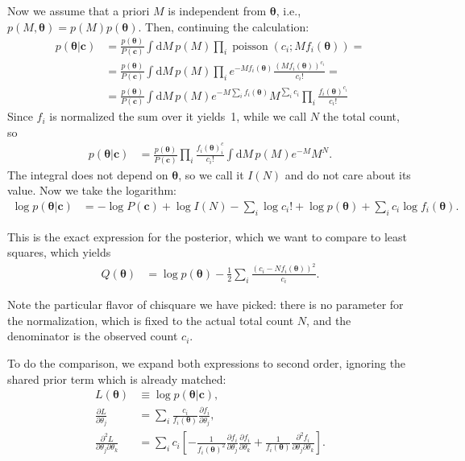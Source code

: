 Now we assume that a priori $M$ is independent from $\boldsymbol\theta$, i.e., 
$p(M,\boldsymbol\theta) = p(M)p(\boldsymbol\theta)$. Then, continuing the
calculation:
%
\begin{align}
    p(\boldsymbol\theta|\mathbf c)
    &= \frac {p(\boldsymbol\theta)} {P(\mathbf c)}
    \int \mathrm dM\, p(M)
    \prod_i \operatorname{poisson}(c_i;Mf_i(\boldsymbol\theta)) = \\
    &= \frac {p(\boldsymbol\theta)} {P(\mathbf c)}
    \int \mathrm dM\, p(M)
    \prod_i
    e^{-Mf_i(\boldsymbol\theta)}
    \frac {(Mf_i(\boldsymbol\theta))^{c_i}} {c_i!} = \\
    &= \frac {p(\boldsymbol\theta)} {P(\mathbf c)}
    \int \mathrm dM\, p(M)
    e^{-M \sum_i f_i(\boldsymbol\theta)}
    M^{\sum_i c_i}
    \prod_i
    \frac {f_i(\boldsymbol\theta)^{c_i}} {c_i!}
\end{align}
%
Since $f_i$ is normalized the sum over it yields~1, while we call $N$ the total
count, so
%
\begin{align}
    p(\boldsymbol\theta|\mathbf c)
    &= \frac {p(\boldsymbol\theta)} {P(\mathbf c)}
    \prod_i
    \frac {f_i(\boldsymbol\theta)^c_i} {c_i!}
    \int \mathrm dM\, p(M) e^{-M} M^N.
\end{align}
%
The integral does not depend on $\boldsymbol\theta$, so we call it $I(N)$ and
do not care about its value. Now we take the logarithm:
%
\begin{align}
    \log p(\boldsymbol\theta|\mathbf c) &=
    -\log P(\mathbf c) + \log I(N) - \sum_i \log c_i!
    + \log p(\boldsymbol\theta) + \sum_i c_i \log f_i(\boldsymbol\theta).
\end{align}

This is the exact expression for the posterior, which we want to compare to
least squares, which yields
%
\begin{align}
    Q(\boldsymbol\theta) &=
    \log p(\boldsymbol\theta)
    -\frac 12
    \sum_i \frac {(c_i - N f_i(\boldsymbol\theta))^2} {c_i}.
\end{align}

Note the particular flavor of chisquare we have picked: there is no parameter
for the normalization, which is fixed to the actual total count $N$, and the
denominator is the observed count $c_i$.

To do the comparison, we expand both expressions to second order, ignoring the
shared prior term which is already matched:
%
\begin{align}
    L(\boldsymbol\theta) &\equiv \log p(\boldsymbol\theta|\mathbf c), \\
    \frac {\partial L} {\partial\theta_j} &=
    \sum_i \frac {c_i} {f_i(\boldsymbol\theta)}
    \frac {\partial f_i} {\partial \theta_j}, \\
    \frac {\partial^2 L} {\partial\theta_j \partial\theta_k} &=
    \sum_i c_i \left[
    -\frac 1 {f_i(\boldsymbol\theta)^2}
    \frac {\partial f_i} {\partial \theta_j}
    \frac {\partial f_i} {\partial \theta_k}
    + \frac 1 {f_i(\boldsymbol\theta)}
    \frac {\partial^2 f_i} {\partial\theta_j \partial\theta_k}
    \right].
\end{align}

